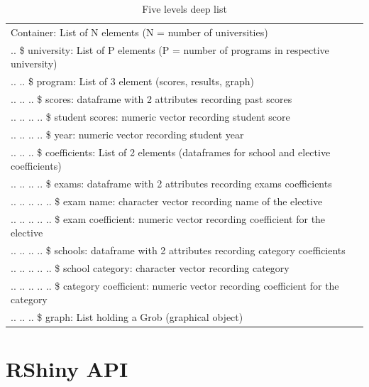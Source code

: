 \documentclass{article}
\begin{document}
\begin{table}[h]
	\caption{Five levels deep list}
	\label{tab:container}
	\centering
	\begin{tabular}{l}
		Container: List of N elements (N = number of universities) \\
		\quad .. \$ university: List of P elements (P = number of programs in respective university)\\
		\quad .. .. \quad \$ program: List of 3 element (scores, results, graph)\\
		\quad .. .. .. \quad \quad \$ scores:  dataframe with 2 attributes recording past scores\\
		\quad .. .. .. .. \quad \quad \quad \$ student scores: numeric vector recording student score\\
		\quad .. .. .. .. \quad \quad \quad \$ year: numeric vector recording student year\\
		\quad .. .. .. \quad \quad \$ coefficients: List of 2 elements (dataframes for school and elective coefficients)\\
		\quad .. .. .. .. \quad \quad \quad \$ exams: dataframe with 2 attributes recording exams coefficients\\
		\quad .. .. .. .. .. \quad \quad \quad \quad \$ exam name: character vector recording name of the elective \\
		\quad .. .. .. .. .. \quad \quad \quad \quad \$ exam coefficient: numeric vector recording coefficient for the elective \\
		\quad .. .. .. .. \quad \quad \quad \$ schools: dataframe with 2 attributes recording category coefficients\\
		\quad .. .. .. .. .. \quad \quad \quad \quad \$ school category: character vector recording category \\
		\quad .. .. .. .. .. \quad \quad \quad \quad \$ category coefficient: numeric vector recording coefficient for the category \\
		\quad .. .. .. \quad \quad \$ graph: List holding a Grob (graphical object)\\
	\end{tabular}
\end{table}

\section{RShiny API}
\end{document}
